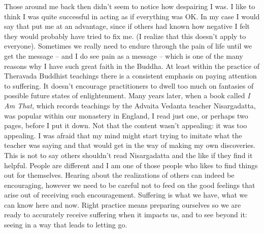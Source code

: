 Those around me back then didn't seem to notice how despairing I was. I
like to think I was quite successful in acting as if everything was OK.
In my case I would say that put me at an advantage, since if others had
known how negative I felt they would probably have tried to fix me. (I
realize that this doesn't apply to everyone). Sometimes we really need
to endure through the pain of life until we get the message -- and I do
see pain as a message -- which is one of the many reasons why I have
such great faith in the Buddha. At least within the practice of
Theravada Buddhist teachings there is a consistent emphasis on paying
attention to suffering. It doesn't encourage practitioners to dwell too
much on fantasies of possible future states of enlightenment. Many years
later, when a book called \emph{I Am That}, which records teachings by
the Advaita Vedanta teacher Nisargadatta, was popular within our
monastery in England, I read just one, or perhaps two pages, before I
put it down. Not that the content wasn't appealing: it was too
appealing. I was afraid that my mind might start trying to imitate what
the teacher was saying and that would get in the way of making my own
discoveries. This is not to say others shouldn't read Nisargadatta and
the like if they find it helpful. People are different and I am one of
those people who likes to find things out for themselves. Hearing about
the realizations of others can indeed be encouraging, however we need to
be careful not to feed on the good feelings that arise out of receiving
such encouragement. Suffering is what we have, what we can know here and
now. Right practice means preparing ourselves so we are ready to
accurately receive suffering when it impacts us, and to see beyond it:
seeing in a way that leads to letting go.

